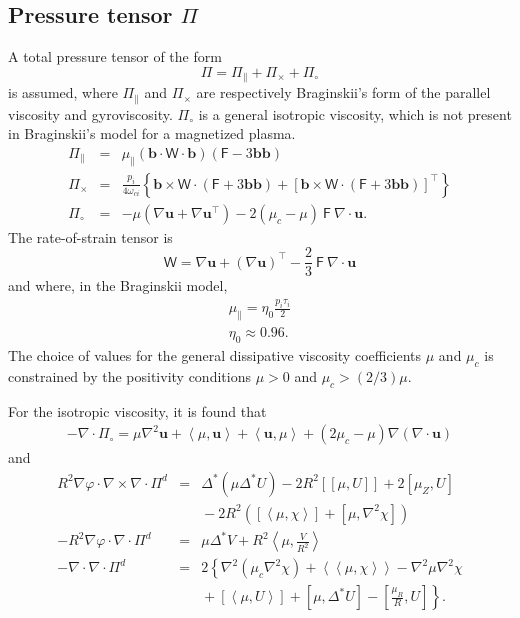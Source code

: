\documentclass[letterpaper]{book}
\renewcommand{\vec}[1]{\ensuremath{\mathbf{#1}}}
\newcommand{\tensor}[1]{\mathsf{#1}}
\newcommand{\tor}{\varphi}              %
\renewcommand{\u}{\vec{u}}
\renewcommand{\P}{\tensor{\Pi}}
\renewcommand{\b}{\vec{b}}
\newcommand{\W}{\tensor{W}}
\newcommand{\grad}[1]{\nabla #1}
\renewcommand{\div}[1]{\nabla \cdot #1}
\newcommand{\curl}[1]{\nabla \times #1}
\newcommand{\gs}[1]{\Delta^* #1}
\newcommand{\lp}[1]{\nabla^2 #1}
\newcommand{\pb}[2]{\left[#1,#2\right]}
\newcommand{\ip}[2]{\left\langle  #1,#2\right\rangle}
\newcommand{\funcss}[2]{
  \left\langle\left\langle #1,#2 \right\rangle\right\rangle}
\newcommand{\funcsa}[2]{\left[\left\langle #1,#2 \right\rangle\right]}
\newcommand{\funcaa}[2]{\left[\left[ #1,#2 \right]\right]}
\begin{document}
\subsection{Pressure tensor $\P$ \label{sec:pressure_tensor}}
A total pressure tensor of the form
\begin{equation}
  \P = \P_\parallel + \P_\times + \P_\circ
\end{equation}
is assumed, where $\P_\parallel$ and $\P_\times$ are respectively
Braginskii's form of the parallel viscosity and gyroviscosity.
$\P_\circ$ is a general isotropic viscosity, which is not present in
Braginskii's model for a magnetized plasma.
\begin{eqnarray}
  \label{eq:parallel_viscosity}
  \P_\parallel & = & \mu_\parallel   \left( \b \cdot \W \cdot \b \right)
  \left( \tensor{F} - 3 \b \b \right)
  \\
  \label{eq:gyroviscosity}
  \P_\times & = & \frac{p_i}{4 \omega_{c i}} \left\{
    \b \times \W \cdot (\tensor{F} + 3 \b\b) +
    \left[\b \times \W \cdot (\tensor{F} + 3 \b\b)\right]^\top
    \right\}
  \\
  \label{eq:general_viscosity}
  \P_\circ & = & -\mu \left(\grad{\u} + \grad{\u}^\top\right)
   -2 \left(\mu_c - \mu \right)\ \tensor{F}\ \div{\u}.
\end{eqnarray}
The rate-of-strain tensor is
\begin{displaymath}
  \W = \nabla \u + (\nabla \u)^\top 
  - \frac{2}{3}\ \tensor{F}\ \div{\u}
\end{displaymath}
and where, in the Braginskii model,
\begin{eqnarray*}
  \mu_\parallel = \eta_0 \frac{p_i \tau_i}{2} 
  \\
  \eta_0 \approx 0.96.  
\end{eqnarray*}
The choice of values for the general dissipative viscosity
coefficients $\mu$ and $\mu_c$ is constrained by the positivity
conditions $\mu > 0$ and $\mu_c > (2/3)\mu$.

For the isotropic viscosity, it is found that
\begin{eqnarray*}
  -\div{\P_\circ} = \mu \lp{\u} + \ip{\mu}{\u} + \ip{\u}{\mu}
  + (2 \mu_c - \mu) \grad{(\div{\u})}
\end{eqnarray*}
and
\begin{eqnarray}
   R^2 \grad{\tor} \cdot \curl{\div \P^d} & = & 
   \gs{(\mu \gs{U})} - 2 R^2 \funcaa{\mu}{U} + 2\pb{\mu_Z}{U}
   \\ \nonumber && \mbox{} 
   - 2 R^2 \left( \funcsa{\mu}{\chi} + \pb{\mu}{\lp{\chi}} \right)
   \\
   -R^2 \grad \tor \cdot \div \P^d & = & \mu \gs{V} 
   + R^2 \ip{\mu}{\frac{V}{R^2}}
   \\
   -\div \div \P^d & = & 2 \left\{ \lp{(\mu_c \lp{\chi})} 
   + \funcss{\mu}{\chi} - \lp{\mu}\lp{\chi}
   \right. \\ && \left. \nonumber \mbox{}
   + \funcsa{\mu}{U} + \pb{\mu}{\gs{U}} - \pb{\frac{\mu_R}{R}}{U} 
   \right\}.
\end{eqnarray}
\end{document}
